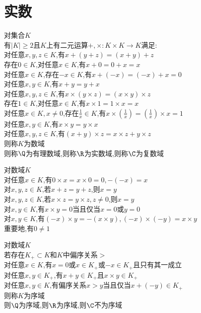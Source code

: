 

%

\setcounter{section}{0}
\setcounter{subsection}{0}

\chapter{实数}

\begin{dingyi}
对集合$K$\\
有$|K|\geq 2$且$K$上有二元运算$+,\times:K\times K\to K$满足:\\
对任意$x,y,z\in K$,有$x+(y+z)=(x+y)+z$\\
存在$0\in K$,对任意$x\in K$,有$x+0=0+x=x$\\
对任意$x\in K$,存在$-x\in K$,有$x+(-x)=(-x)+x=0$\\
对任意$x,y\in K$,有$x+y=y+x$\\
对任意$x,y,z\in K$,有$x\times (y\times z)=(x\times y)\times z$\\
存在$1\in K$,对任意$x\in K$,有$x\times 1=1\times x=x$\\
对任意$x\in K,x\neq 0$,存在$\frac{1}{x}\in K$,有$x\times (\frac{1}{x})=(\frac{1}{x})\times x=1$\\
对任意$x,y\in K$,有$x\times y=y\times x$\\
对任意$x,y,z\in K$,有$(x+y)\times z=x\times z+y\times z$\\
则称$K$为数域\\
则称$\Q$为有理数域,则称$\R$为实数域,则称$\C$为复数域
\end{dingyi}

\begin{dingli}
对数域$K$\\
对任意$x\in K$,有$0\times x=x\times 0=0,-(-x)=x$\\
对$x,y,z\in K$,若$x+z=y+z$,则$x=y$\\
对$x,y,z\in K$,若$x\times z=y\times z,z\neq 0$,则$x=y$\\
对$x,y\in K$,有$x\times y=0$当且仅当$x=0$或$y=0$\\
对$x,y\in K$,有$(-x)\times y=-(x\times y),(-x)\times(-y)=x\times y$\\
重要地,有$0\neq 1$
\end{dingli}

\begin{dingyi}
对数域$K$\\
若存在$K_{+}\subset K$和$K$中偏序关系$>$\\
对任意$x\in K$,有$x=0$或$x\in K_{+}$或$-x\in K_{+}$且只有其一成立\\
对任意$x,y\in K_{+}$,有$x+y\in K_{+}$且$x\times y\in K_{+}$\\
对任意$x,y\in K$,有偏序关系$x>y$当且仅当$x+(-y)\in K_{+}$\\
则称$K$为序域\\
则$\Q$为序域,则$\R$为序域,则$\C$不为序域
\end{dingyi}

